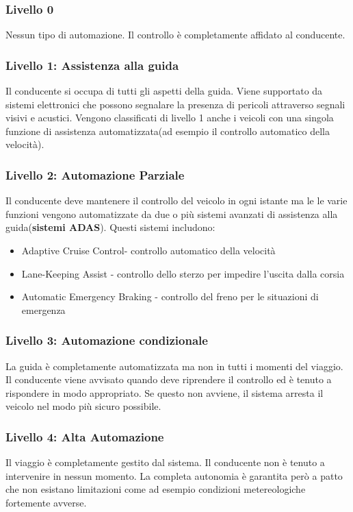 \subsubsection{Livello 0}
Nessun tipo di automazione. Il controllo è completamente affidato al conducente.
\subsubsection{Livello 1: Assistenza alla guida}
Il conducente si occupa di tutti gli aspetti della guida. Viene supportato da sistemi elettronici che possono  segnalare la presenza di pericoli attraverso segnali visivi e acustici.
Vengono classificati di livello 1 anche i veicoli con una singola funzione di assistenza automatizzata(ad esempio il controllo automatico della velocità).
\subsubsection{Livello 2: Automazione Parziale}
Il conducente deve mantenere il controllo del veicolo in ogni istante ma le le varie funzioni vengono automatizzate da 
due o più sistemi avanzati di assistenza alla guida(\textbf{sistemi ADAS}). Questi sistemi includono:
\begin{itemize}
    \item Adaptive Cruise Control- controllo automatico della velocità
    \item Lane-Keeping Assist - controllo dello sterzo per impedire l'uscita dalla corsia
    \item Automatic Emergency Braking -  controllo del freno per le situazioni di emergenza
\end{itemize}
\subsubsection{Livello 3: Automazione condizionale}
La guida è completamente automatizzata ma non in tutti i momenti del viaggio. Il conducente viene avvisato quando deve riprendere il controllo ed è tenuto a rispondere
in modo appropriato. Se questo non avviene, il sistema arresta il veicolo nel modo più sicuro possibile.
\subsubsection{Livello 4: Alta Automazione}
Il viaggio è completamente gestito dal sistema. Il conducente non è tenuto a intervenire in nessun momento. La completa autonomia è garantita però a patto che non esistano limitazioni come ad esempio condizioni
metereologiche fortemente avverse.
